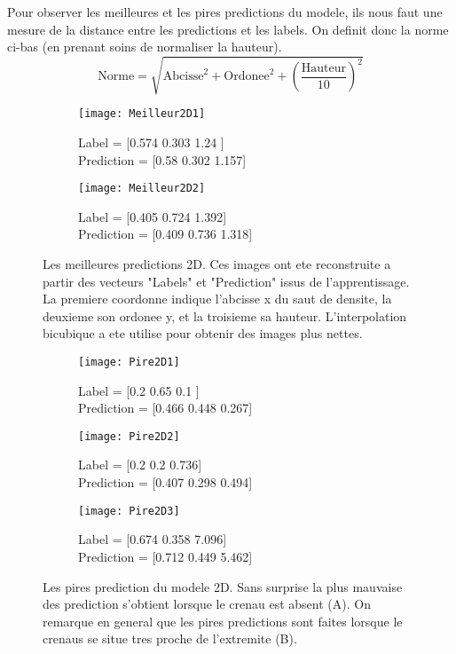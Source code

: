     Pour observer les meilleures et les pires predictions du modele, ils nous faut une mesure de la distance entre les predictions et les labels. On definit donc la norme ci-bas (en prenant soins de normaliser la hauteur). $$ \text{Norme} = \sqrt{\text{Abcisse}^2 + \text{Ordonee}^2 + \left( \frac{\text{Hauteur}}{10} \right)^2}$$
    
    \begin{figure}[!h]
    \begin{subfigure}{.5\textwidth}
    \centering
    \texttt{[image: Meilleur2D1]}  
    \caption[Meilleur2D1]{Label = [0.574 0.303 1.24 ] \\ Prediction = [0.58  0.302 1.157]}
    \end{subfigure}
    \begin{subfigure}{.5\textwidth}
    \centering
    \texttt{[image: Meilleur2D2]}  
    \caption[Meilleur2D2]{Label = [0.405 0.724 1.392]  \\  Prediction = [0.409 0.736 1.318]}
    \end{subfigure}
    
     \centering
    \decoRule
    \caption[Meilleur 2D]{Les meilleures predictions 2D. Ces images ont ete reconstruite a partir des  vecteurs "Labels" et "Prediction" issus de l'apprentissage. La premiere coordonne indique l'abcisse x du saut de densite, la deuxieme son ordonee y, et la troisieme sa hauteur. L'interpolation bicubique a ete utilise pour obtenir des images plus nettes.}
    \label{fig:Meilleur2D}
    \end{figure}

    \begin{figure}[H]
    \begin{subfigure}{.33\textwidth}
    \centering
    \texttt{[image: Pire2D1]}  
    \caption[Pire2D1]{Label = [0.2  0.65 0.1 ] \\ Prediction = [0.466 0.448 0.267]}
    \end{subfigure}
    \begin{subfigure}{.33\textwidth}
    \centering
    \texttt{[image: Pire2D2]}  
    \caption[Pire2D2]{Label = [0.2   0.2   0.736]  \\ Prediction = [0.407 0.298 0.494]}
    \end{subfigure}
    \begin{subfigure}{.33\textwidth}
    \centering
    \texttt{[image: Pire2D3]}  
    \caption[Pire2D3]{Label = [0.674 0.358 7.096]  \\ Prediction = [0.712 0.449 5.462]}
    \end{subfigure}

     \centering
    \decoRule
    \caption[Pire2D]{Les pires prediction du modele 2D. Sans surprise la plus mauvaise des prediction s'obtient lorsque le crenau est absent (A). On remarque en general que les pires predictions sont faites lorsque le crenaus se situe tres proche de l'extremite (B).}
    \label{fig:Pire2D}
    \end{figure}
    
